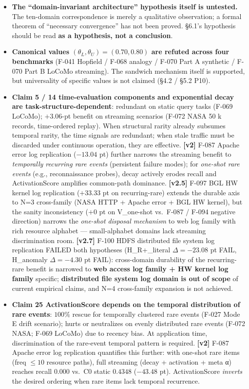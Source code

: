 \begin{itemize}
\tightlist
\item
  \textbf{The ``domain-invariant architecture'' hypothesis itself is untested.} The ten-domain correspondence is merely a qualitative observation; a formal theorem of ``necessary convergence'' has not been proved. §6.1's hypothesis should be read \textbf{as a hypothesis, not a conclusion}.
\item
  \textbf{Canonical values \((\theta_L, \theta_U) = (0.70, 0.80)\) are refuted across four benchmarks} (F-041 Hopfield / F-068 analogy / F-070 Part A synthetic / F-070 Part B LoCoMo streaming). The sandwich mechanism itself is supported, but universality of specific values is not claimed (§4.2 / §5.2 P10).
\item
  \textbf{Claim 5 / 14 time-evaluation components and exponential decay are task-structure-dependent}: redundant on static query tasks (F-069 LoCoMo); \(+3.06\)-pt benefit on streaming scenarios (F-072 NASA 50 k records, time-ordered replay). When structural rarity already subsumes temporal rarity, the time signals are redundant; when stale traffic must be discarded under continuous operation, they are effective. \textbf{{[}v2{]}} F-087 Apache error log replication (\(-13.04\) pt) further narrows the streaming benefit to \emph{temporally recurring rare events} (persistent failure modes); for \emph{one-shot rare events} (e.g., reconnaissance probes), decay actively erodes recall and ActivationScore amplifies common-path dominance. \textbf{{[}v2.5{]}} F-097 BGL HW kernel log replication (\(+33.33\) pt on recurring-rare) extends the durable axis to N=3 cross-family (NASA HTTP + Apache error + BGL HW kernel), but the sanity inconsistency (\(+0\) pt on V\_one-shot vs.~F-087 / F-094 negative direction) narrows the \emph{one-shot disposal mechanism} to web log family with rich resource alphabet --- small-alphabet domains lack streaming discrimination room. \textbf{{[}v2.7{]}} F-100 HDFS distributed file system log replication FAILED both hypotheses (H\_R+\_literal \(\Delta = -23.08\) pt FAIL, H\_anomaly \(\Delta = -4.30\) pt FAIL): cross-domain durability of the recurring-rare benefit is narrowed to \textbf{web access log family + HW kernel log family} specific; \textbf{distributed file system log domain is out of scope} of current empirical claims, and N=4 cross-family expansion is not achieved.
\item
  \textbf{Claim 25 ActivationScore depends on the temporal distribution of rare events}: \(100\%\) rescue for temporally clustered rare events (F-027 Mode E drift scenario); hurts or neutralizes on evenly distributed rare events (F-072 NASA; F-069 LoCoMo) due to recency bias. At application time, discrimination of the rare-event temporal pattern is required. \textbf{{[}v2{]}} F-087 Apache error log replication quantifies this further: with one-shot rare items (freq \(\le 10\) resource paths), full streaming (decay + activation + meta α) reaches recall \(0.000\) vs.~C0 static \(0.4348\) (\(-43.48\) pt). ActivationScore \emph{inverts} the desired ordering when rare items lack temporal recurrence.

\end{itemize}
